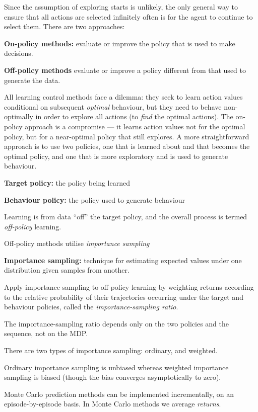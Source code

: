 \documentclass{article}
\begin{document}
Since the assumption of exploring starts is unlikely, the only general way to ensure that all actions are selected infinitely often is for the agent to continue to select them. There are two approaches:

\textbf{On-policy methods:} evaluate or improve the policy that is used
to make decisions.

\textbf{Off-policy methods} evaluate or improve a policy different from
that used to generate the data.

All learning control methods face a dilemma: they seek to learn action
values conditional on subsequent \emph{optimal} behaviour, but they need
to behave non-optimally in order to explore all actions (to \emph{find}
the optimal actions). The on-policy approach is a compromise --- it
learns action values not for the optimal policy, but for a near-optimal
policy that still explores. A more straightforward approach is to use
two policies, one that is learned about and that becomes the optimal
policy, and one that is more exploratory and is used to generate
behaviour.

\textbf{Target policy:} the policy being learned

\textbf{Behaviour policy:} the policy used to generate behaviour

Learning is from data ``off'' the target policy, and the overall process
is termed \emph{off-policy} learning.

Off-policy methods utilise \emph{importance sampling}

\textbf{Importance sampling:} technique for estimating expected values
under one distribution given samples from another.

Apply importance sampling to off-policy learning by weighting returns
according to the relative probability of their trajectories occurring
under the target and behaviour policies, called the
\emph{importance-sampling ratio}.

The importance-sampling ratio depends only on the two policies and the
sequence, not on the MDP.

There are two types of importance sampling: ordinary, and weighted.

Ordinary importance sampling is unbiased whereas weighted importance
sampling is biased (though the bias converges asymptotically to zero).

Monte Carlo prediction methods can be implemented incrementally, on an
episode-by-episode basis. In Monte Carlo methods we average
\emph{returns}.
\end{document}
